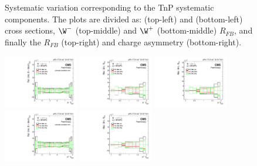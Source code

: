 \begin{figure}[!htbp]
\begin{center}
 \end{center}
 \caption{Systematic variation corresponding to the TnP systematic components. The plots are divided as: \WToMuNuMi (top-left) and \WToMuNuPl (bottom-left) cross sections, $\W^{-}$ (top-middle) and $\W^{+}$ (bottom-middle) $R_{FB}$, and finally the \W $R_{FB}$ (top-right) and \W charge asymmetry (bottom-right).}
 \label{fig:Systematic_Eff_TnP_Syst}
\end{figure}


\begin{figure}[!htbp]
 \begin{center}
  \includegraphics[width=0.29\textwidth]{Figures/WBoson/Analysis/Systematics/Combined/PA/Cross_Section/gr_WToMuMi_PA_Cross_Section_EffTnP_TnP_Stat.pdf}
  \includegraphics[width=0.29\textwidth]{Figures/WBoson/Analysis/Systematics/Combined/PA/ForwardBackward_Ratio/gr_WToMuMi_PA_ForwardBackward_Ratio_EffTnP_TnP_Stat.pdf}
  \includegraphics[width=0.29\textwidth]{Figures/WBoson/Analysis/Systematics/Combined/PA/ForwardBackward_Ratio/gr_WToMuInc_PA_ForwardBackward_Ratio_EffTnP_TnP_Stat.pdf}
  \includegraphics[width=0.29\textwidth]{Figures/WBoson/Analysis/Systematics/Combined/PA/Cross_Section/gr_WToMuPl_PA_Cross_Section_EffTnP_TnP_Stat.pdf}
  \includegraphics[width=0.29\textwidth]{Figures/WBoson/Analysis/Systematics/Combined/PA/ForwardBackward_Ratio/gr_WToMuPl_PA_ForwardBackward_Ratio_EffTnP_TnP_Stat.pdf}

\end{center}
\end{figure}
